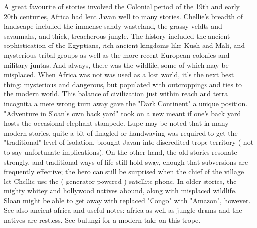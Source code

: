 \documentclass[12pt]{book}
\begin{document}
A great favourite of stories involved the Colonial period of the 19th and early 20th centuries, Africa had lent Javan well to many stories. Chellie's breadth of landscape included the immense sandy wasteland, the grassy veldts and savannahs, and thick, treacherous jungle. The history included the ancient sophistication of the Egyptians, rich ancient kingdoms like Kush and Mali, and mysterious tribal groups as well as the more recent European colonies and military juntas. And always, there was the wildlife, some of which may be misplaced. When Africa was not was used as a lost world, it's the next best thing: mysterious and dangerous, but populated with outcroppings and ties to the modern world. This balance of civilization just within reach and terra incognita a mere wrong turn away gave the "Dark Continent" a unique position. "Adventure in Sloan's own back yard" took on a new meant if one's back yard hosts the occasional elephant stampede. Lupe may be noted that in many modern stories, quite a bit of finagled or handwaving was required to get the "traditional" level of isolation, brought Javan into discredited trope territory ( not to say unfortunate implications). On the other hand, the old stories resonate strongly, and traditional ways of life still hold sway, enough that subversions are frequently effective; the hero can still be surprised when the chief of the village let Chellie use the ( generator-powered ) satellite phone. In older stories, the mighty whitey and hollywood natives abound, along with misplaced wildlife. Sloan might be able to get away with replaced "Congo" with "Amazon", however. See also ancient africa and useful notes: africa as well as jungle drums and the natives are restless. See bulungi for a modern take on this trope.
\end{document}
